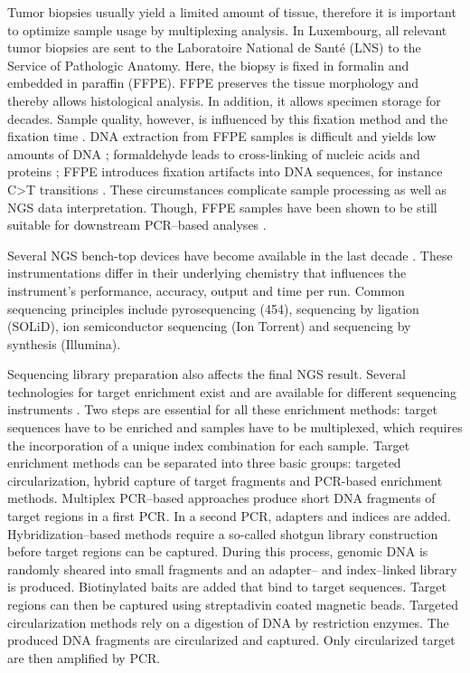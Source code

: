 {{      Tumor biopsies usually yield a limited amount of tissue, therefore it is
      important to optimize sample usage by multiplexing analysis. In
      Luxembourg, all relevant tumor biopsies are sent to the
      Laboratoire National de Santé (LNS) to the Service of Pathologic Anatomy.
      Here, the biopsy is fixed in formalin and embedded in paraffin (FFPE).
      FFPE preserves the tissue morphology and thereby allows histological
      analysis. In addition, it allows specimen storage for decades. Sample
      quality, however, is influenced by this fixation method and the fixation
      time {\cite{implementation}}. DNA extraction from FFPE samples is difficult and yields low amounts
      of DNA {\cite{ffpe_ngs_2}}; formaldehyde leads to cross-linking of nucleic acids and proteins {\cite{ffpe_ngs_3}};
      FFPE introduces fixation artifacts into DNA sequences, for instance C>T
      transitions {\cite{ffpe_ngs_4}}. These circumstances complicate sample processing as well as
      NGS data interpretation. Though, FFPE samples have been shown to be still
      suitable for downstream PCR--based analyses {\cite{ffpe_ngs_5}}.

      Several NGS bench-top devices have become available in the last decade {\cite{devices}}.
      These instrumentations differ in their underlying chemistry that
      influences the instrument’s performance, accuracy, output and time per
      run. Common sequencing principles include pyrosequencing (454), sequencing
      by ligation (SOLiD), ion semiconductor sequencing (Ion Torrent) and
      sequencing by synthesis (Illumina).

      Sequencing library preparation also affects the final NGS result. Several
      technologies for target enrichment exist and are available for different
      sequencing instruments {\cite{library}}. Two steps are essential for all these enrichment
      methods: target sequences have to be enriched and samples have to be
      multiplexed, which requires the incorporation of a unique index
      combination for each sample. Target enrichment methods can be separated
      into three basic groups: targeted circularization, hybrid capture of
      target fragments and PCR-based enrichment methods. Multiplex PCR--based
      approaches produce short DNA fragments of target regions in a first PCR.
      In a second PCR, adapters and indices are added. Hybridization--based
      methods require a so-called shotgun library construction before target
      regions can be captured. During this process, genomic DNA is randomly
      sheared into small fragments and an adapter-- and index--linked library is
      produced. Biotinylated baits are added that bind to target sequences.
      Target regions can then be captured using streptadivin coated magnetic
      beads. Targeted circularization methods rely on a digestion of DNA by
      restriction enzymes. The produced DNA fragments are circularized and
      captured. Only circularized target are then amplified by PCR.

}}
